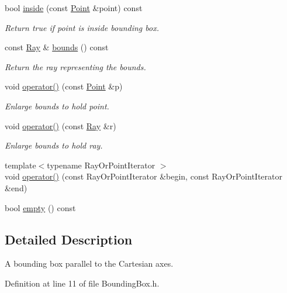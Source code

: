 \begin{DoxyCompactItemize}
bool \hyperlink{class_wire_cell_1_1_bounding_box_a5d0ef4e3335f0aaf0a4a8fa577914539}{inside} (const \hyperlink{namespace_wire_cell_ab2b2565fa6432efbb4513c14c988cda9}{Point} \&point) const
\begin{DoxyCompactList}\small\item\em Return true if point is inside bounding box. \end{DoxyCompactList}\item 
const \hyperlink{namespace_wire_cell_a3ab20d9b438feb7eb1ffaab9ba98af0c}{Ray} \& \hyperlink{class_wire_cell_1_1_bounding_box_a3a0816d852fb478e057496a0409e0c72}{bounds} () const
\begin{DoxyCompactList}\small\item\em Return the ray representing the bounds. \end{DoxyCompactList}\item 
void \hyperlink{class_wire_cell_1_1_bounding_box_a2f43d9aa9cf70e9515cdad9e43537575}{operator()} (const \hyperlink{namespace_wire_cell_ab2b2565fa6432efbb4513c14c988cda9}{Point} \&p)
\begin{DoxyCompactList}\small\item\em Enlarge bounds to hold point. \end{DoxyCompactList}\item 
void \hyperlink{class_wire_cell_1_1_bounding_box_afcc27be243bd23302b647ac9eafa536b}{operator()} (const \hyperlink{namespace_wire_cell_a3ab20d9b438feb7eb1ffaab9ba98af0c}{Ray} \&r)
\begin{DoxyCompactList}\small\item\em Enlarge bounds to hold ray. \end{DoxyCompactList}\item 
{\footnotesize template$<$typename Ray\+Or\+Point\+Iterator $>$ }\\void \hyperlink{class_wire_cell_1_1_bounding_box_ad5b6bb08392180f15f1647a8b76ffcc9}{operator()} (const Ray\+Or\+Point\+Iterator \&begin, const Ray\+Or\+Point\+Iterator \&end)
\item 
bool \hyperlink{class_wire_cell_1_1_bounding_box_a142836bb402b1c40c0dd19dd4c88a548}{empty} () const
\end{DoxyCompactItemize}


\subsection{Detailed Description}
A bounding box parallel to the Cartesian axes. 

Definition at line 11 of file Bounding\+Box.\+h.




